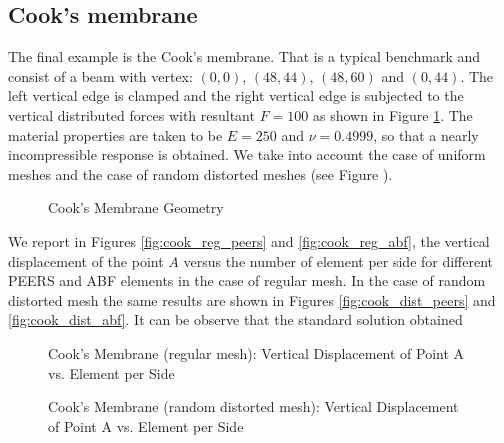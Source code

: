 \documentclass[a4paper,11pt]{article}
\begin{document}
\subsection{Cook's membrane}
The final example is the Cook's membrane. That is a typical benchmark and consist of a beam with vertex: $(0,0)$, $(48,44)$, $(48,60)$ and $(0,44)$.
The left vertical edge is clamped and the right vertical edge is subjected to the vertical distributed forces with resultant $F=100$ as shown in Figure \ref{fig:cook_membrane}.
The material properties are taken to be $E = 250$ and $\nu = 0.4999$, so that a nearly incompressible response is obtained.
We take into account the case of uniform meshes and the case of random distorted meshes (see Figure ).
\begin{figure}[!ht]
\begin{center}

\caption{Cook's Membrane Geometry \label{fig:cook_membrane}}
\end{center}
\end{figure}
We report in Figures \ref{fig:cook_reg_peers} and \ref{fig:cook_reg_abf}, the vertical displacement of the point $A$ versus the number of element per side for different PEERS and ABF elements in the case of regular mesh.
In the case of random distorted mesh the same results are shown in Figures  \ref{fig:cook_dist_peers} and \ref{fig:cook_dist_abf}.
It can be observe that the standard solution obtained  
%
\begin{figure}[!ht]
\begin{center}
\caption{Cook's Membrane (regular mesh): Vertical Displacement of Point A vs. Element per Side}
\end{center}
\end{figure}
%
\begin{figure}[!ht]
\begin{center}
\caption{Cook's Membrane (random distorted mesh): Vertical Displacement of Point A vs. Element per Side}
\end{center}
\end{figure}
\end{document}
